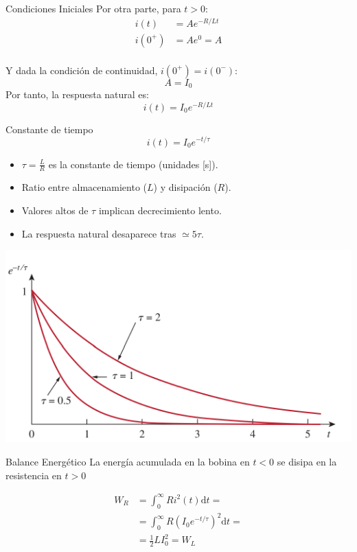 \documentclass[xcolor={usenames,svgnames,dvipsnames}]{beamer}
\begin{document}
\begin{frame}[label={sec:orgdd8f394}]{Condiciones Iniciales}
Por otra parte, para \(t > 0\):
\begin{align*}
  i(t) &= A e^{-R/L t}\\
  i(0^+) &= A e^0 = A\\
\end{align*}

Y dada la condición de continuidad, \(i(0^+) = i(0^-)\):
\[
  A = I_0
\]
Por tanto, la respuesta natural es:
\[
  \boxed{i(t) = I_0 e^{-R/L t}}
\]
\end{frame}



\begin{frame}[label={sec:orgfa58142}]{Constante de tiempo}
\[
  \boxed{i(t) = I_0 e^{-t/\tau}}
\]

\begin{itemize}
\item \(\tau = \frac{L}{R}\) es la constante de tiempo (unidades [s]).
\item Ratio entre almacenamiento (\(L\)) y disipación (\(R\)).
\item Valores altos de \(\tau\) implican decrecimiento lento.
\item La respuesta natural \guillemotleft{}desaparece\guillemotright{} tras \(\simeq 5\tau\).
\end{itemize}
\begin{center}
\includegraphics[height=0.5\textheight]{figs/constante_tiempo.pdf}
\end{center}
\end{frame}

\begin{frame}[label={sec:orgd0ee3e7}]{Balance Energético}
La energía acumulada en la bobina en \(t < 0\) se disipa en la resistencia en \(t > 0\)

\begin{align*}
  W_R &= \int_0^\infty R i^2(t)  \mathrm{d}t =\\
  &= \int_0^\infty R (I_0 e^{-t/\tau})^2  \mathrm{d}t = \\
  &= \frac{1}{2} L I_0^2 = W_L  
\end{align*}
\end{frame}
\end{document}
